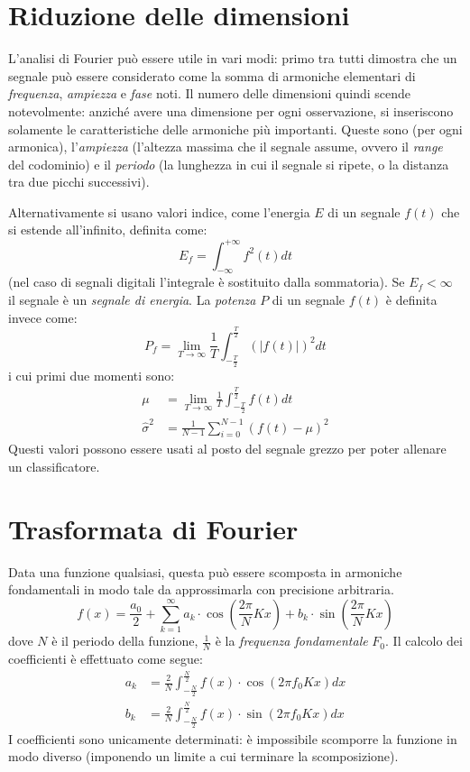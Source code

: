 \documentclass[11pt, a4page]{article}
\begin{document}
\section{Riduzione delle dimensioni}
L'analisi di Fourier può essere utile in vari modi: primo tra tutti dimostra che un segnale può essere considerato come la somma di armoniche elementari di \textit{frequenza}, \textit{ampiezza} e \textit{fase} noti.
Il numero delle dimensioni quindi scende notevolmente: anziché avere una dimensione per ogni osservazione, si inseriscono solamente le caratteristiche delle armoniche più importanti.
Queste sono (per ogni armonica), l'\textit{ampiezza} (l'altezza massima che il segnale assume, ovvero il \textit{range} del codominio) e il \textit{periodo} (la lunghezza in cui il segnale si ripete, o la distanza tra due picchi successivi). \newline

Alternativamente si usano valori indice, come l'energia $E$ di un segnale $f(t)$ che si estende all'infinito, definita come:
\begin{equation*}
  E_f = \int_{-\infty}^{+\infty} f^2(t) dt
\end{equation*}
(nel caso di segnali digitali l'integrale è sostituito dalla sommatoria).
Se $E_f < \infty$ il segnale è un \textit{segnale di energia}.
La \textit{potenza} $P$ di un segnale $f(t)$ è definita invece come:
\begin{equation*}
  P_f = \lim_{T \to \infty} \frac{1}{T}\int_{-\frac{T}{2}}^{\frac{T}{2}}(|f(t)|)^2 dt
\end{equation*}
i cui primi due momenti sono:
\begin{align*}
  \mu &= \lim_{T \to \infty} \frac{1}{T} \int_{-\frac{T}{2}}^{\frac{T}{2}} f(t) dt \\
  \hat{\sigma}^2 &= \frac{1}{N - 1} \sum_{i=0}^{N - 1} (f(t) - \mu)^2
\end{align*}
Questi valori possono essere usati al posto del segnale grezzo per poter allenare un classificatore.

\section{Trasformata di Fourier}
Data una funzione qualsiasi, questa può essere scomposta in armoniche fondamentali in modo tale da approssimarla con precisione arbitraria.
\begin{equation*}
  f(x) = \frac{a_0}{2} + \sum_{k=1}^{\infty}a_k \cdot \cos(\frac{2\pi}{N}Kx) + b_k \cdot \sin(\frac{2\pi}{N}Kx)
\end{equation*}
dove $N$ è il periodo della funzione, $\frac{1}{N}$ è la \textit{frequenza fondamentale} $F_0$.
Il calcolo dei coefficienti è effettuato come segue:
\begin{align*}
  a_k &= \frac{2}{N} \int_{-\frac{N}{2}}^{\frac{N}{2}}f(x) \cdot \cos(2\pi f_0 Kx) dx \\
  b_k &= \frac{2}{N} \int_{-\frac{N}{2}}^{\frac{N}{2}}f(x) \cdot \sin(2\pi f_0 Kx) dx
\end{align*}
I coefficienti sono unicamente determinati: è impossibile scomporre la funzione in modo diverso (imponendo un limite a cui terminare la scomposizione).
\end{document}
